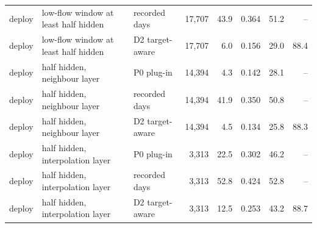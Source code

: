\begin{table}
{\begin{tabular}{lllrrrrr}
deploy & low-flow window at least half hidden & recorded days & 17{,}707 & 43.9 & 0.364 & 51.2 & -- \\
deploy & low-flow window at least half hidden & D2 target-aware & 17{,}707 & 6.0 & 0.156 & 29.0 & 88.4 \\
deploy & half hidden, neighbour layer & P0 plug-in & 14{,}394 & 4.3 & 0.142 & 28.1 & -- \\
deploy & half hidden, neighbour layer & recorded days & 14{,}394 & 41.9 & 0.350 & 50.8 & -- \\
deploy & half hidden, neighbour layer & D2 target-aware & 14{,}394 & 4.5 & 0.134 & 25.8 & 88.3 \\
deploy & half hidden, interpolation layer & P0 plug-in & 3{,}313 & 22.5 & 0.302 & 46.2 & -- \\
deploy & half hidden, interpolation layer & recorded days & 3{,}313 & 52.8 & 0.424 & 52.8 & -- \\
deploy & half hidden, interpolation layer & D2 target-aware & 3{,}313 & 12.5 & 0.253 & 43.2 & 88.7 \\
\bottomrule
\end{tabular}
}
\end{table}
